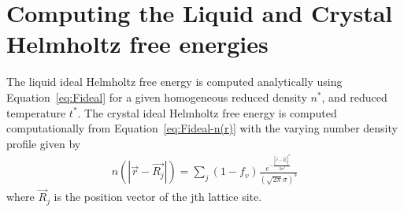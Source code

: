 \documentclass[double,12pt]{beavtex}
\begin{document}
\section{Computing the Liquid and Crystal Helmholtz free energies}

The liquid ideal Helmholtz free energy is computed analytically 
using Equation~\ref{eq:Fideal} 
for a given homogeneous reduced density $n^*$, and reduced temperature $t^*$. 
The crystal ideal Helmholtz free energy is computed computationally 
from Equation~\ref{eq:Fideal-n(r)} with the varying number density profile given by
\begin{align}
  n(|\vec{r}-\vec{R_j}|)=\sum_j{(1-f_v)\frac{e^{-\frac{{|\vec{r}-\vec{R_j}|}^2}{2{\sigma}^2}}}{\left(\sqrt{2\pi}\sigma\right)^3}}
\end{align}
where $\vec R_j$ is the position vector of the jth lattice site.
\end{document}
